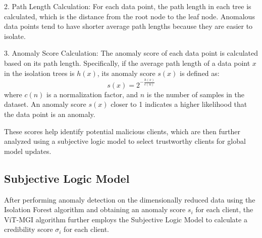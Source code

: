 \documentclass[conference]{IEEEtran}
\begin{document}

2. Path Length Calculation: For each data point, the path length in each tree is calculated, which is the distance from the root node to the leaf node. Anomalous data points tend to have shorter average path lengths because they are easier to isolate.


3. Anomaly Score Calculation: The anomaly score of each data point is calculated based on its path length. Specifically, if the average path length of a data point $x$ in the isolation trees is $h(x)$, its anomaly score $s(x)$ is defined as:
   \[
   s(x) = 2^{-\frac{h(x)}{c(n)}}
   \]
where $c(n)$ is a normalization factor, and $n$ is the number of samples in the dataset. An anomaly score $s(x)$ closer to 1 indicates a higher likelihood that the data point is an anomaly.

These scores help identify potential malicious clients, which are then further analyzed using a subjective logic model to select trustworthy clients for global model updates.


\subsection{Subjective Logic Model}
\label{sec:method_subjective}


After performing anomaly detection on the dimensionally reduced data using the Isolation Forest algorithm and obtaining an anomaly score $s_i$ for each client, the ViT-MGI algorithm further employs the Subjective Logic Model\cite{Subjective_Logic_Model} to calculate a credibility score $\sigma_i$ for each client.

\end{document}
